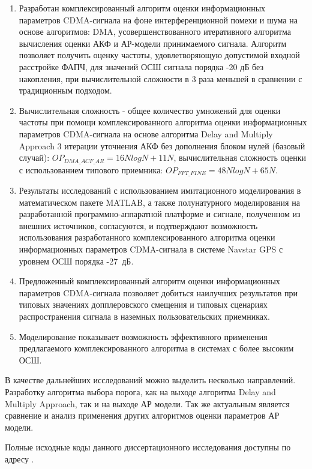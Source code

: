 \begin{enumerate}
	\item {Разработан комплексированный алгоритм оценки информационных параметров CDMA-сигнала на фоне интерференционной помехи и шума на основе алгоритмов:
		DMA, усовершенствованного итеративного алгоритма вычисления оценки АКФ и АР-модели принимаемого сигнала. Алгоритм позволяет получить оценку частоты,
		удовлетворяющую допустимой входной расстройке ФАПЧ, для значений ОСШ сигнала порядка -20 дБ без накопления, при вычислительной сложности в 3 раза меньшей
		в сравнении с традиционным подходом.}
	\item Вычислительная сложность - общее количество умножений для оценки частоты при помощи комплексированного алгоритма оценки информационных параметров CDMA-сигнала
		на основе алгоритма Delay and Multiply Approach 3 итерации уточнения АКФ без дополнения блоком нулей (базовый случай): ${OP_{DMA\_ACF\_AR} = 16NlogN + 11N}$,
		вычислительная сложность оценки с использованием типового приемника: ${OP_{FFT\_FINE} = 48NlogN + 65N}$.

	\item {Результаты исследований с использованием имитационного моделирования в математическом пакете MATLAB, а также полунатурного моделирования на разработанной
		программно-аппаратной платформе и сигнале, полученном из внешних источников, согласуются, и подтверждают возможность использования разработанного
		комплексированного алгоритма оценки информационных параметров CDMA-сигнала в системе Navstar GPS с уровнем ОСШ порядка \mbox{-27 дБ.}}

	\item {Предложенный комплексированный алгоритм оценки информационных параметров CDMA-сигнала позволяет добиться наилучших результатов при типовых значениях
		допплеровского смещения и типовых сценариях распространения сигнала в наземных пользовательских приемниках.}

	\item Моделирование показывает возможность эффективного применения предлагаемого комплексированного алгоритма в системах с более высоким ОСШ.
\end{enumerate}

В качестве дальнейших исследований можно выделить несколько направлений. Разработку алгоритма выбора порога, как на выходе алгоритма Delay and Multiply Approach,
так и на выходе АР модели. Так же актуальным является сравнение и анализ применения других алгоритмов оценки параметров АР модели. 

Полные исходные коды данного диссертационного исследования доступны по адресу \cite{phdSRC}.

\clearpage
